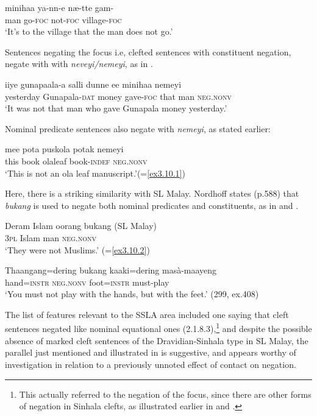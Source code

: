 \ea\label{ex3.10.10} 
\gll minihaa  ya-nn-e n{\ae}-tte gam{\E}-{\dott}{\E}\\
 man  go-\textsc{foc} not-\textsc{foc}  village-\textsc{foc}\\
 `It's to the village that the man does not go.' \citep{DeAbrew1981}
\z


 Sentences negating the focus i.e, clefted sentences with constituent negation, negate with with \textit{neveyi/nemeyi}, as in . 


\ea\label{ex3.10.11} 
\gll iiye gunapaala-{\dott}a salli dunne ee minihaa nemeyi\\
  yesterday Gunapala-\textsc{dat} money gave-\textsc{foc} that man \textsc{neg.nonv}\\
 `It was not that man who gave Gunapala money yesterday.'
\z


Nominal predicate sentences also negate with \textit{nemeyi}, as stated earlier:


\ea\label{ex3.10.12} 
\gll mee pota puskola potak nemeyi\\
 this book olaleaf book-\textsc{indef} \textsc{neg.nonv} \\
 `This is not an ola leaf manuscript.'(=\ref{ex3.10.1})
\z


Here, there is a striking similarity with SL Malay. Nordhoff states (p.588) that \textit{bukang} is used to negate both nominal predicates and constituents, as in  and .


\ea\label{ex3.10.13} 
\gll Deram Islam oorang bukang (SL Malay)\\
  3\textsc{pl} Islam man \textsc{neg.nonv}\\
  `They were not Muslims.' (=\ref{ex3.10.2})
\z




\ea\label{ex3.10.14} 
\gll Thaangang=dering bukang kaaki=dering masà-maayeng\\
  hand=\textsc{instr} \textsc{neg.nonv}  foot=\textsc{instr}  must-play\\
  `You must not play with the hands, but with the feet.' (299, ex.408)
\z


The list of features relevant to the SSLA area included one saying that cleft sentences negated like nominal equational ones (2.1.8.3),\footnote{This
  actually referred to the negation of the focus, since there are other forms of negation in Sinhala clefts, as illustrated earlier in  and .} 
and despite the possible absence of marked cleft sentences of the Dravidian-Sinhala type in SL Malay, the parallel just mentioned and illustrated in  is suggestive, and appears worthy of investigation in relation to a previously unnoted effect of contact on negation.



